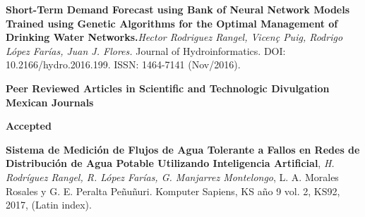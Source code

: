 \documentclass[10pt]{article}
\newenvironment{innerlist}[1][\enskip\textbullet]%
        {\begin{compactitem}[#1]}{\end{compactitem}}
\newcommand{\blankline}{\quad\pagebreak[2]}
\begin{document}
\begin{innerlist}
\item \textbf{Short-Term Demand Forecast using Bank of Neural Network Models Trained using Genetic Algorithms for the Optimal Management of Drinking Water Networks.}\textit{Hector Rodriguez Rangel, Vicen\c{c} Puig, Rodrigo López Farías, Juan J. Flores.}  {Journal of Hydroinformatics}. DOI: 10.2166/hydro.2016.199. ISSN: 1464-7141 (Nov/2016).

\blankline

\textbf{Peer Reviewed Articles in Scientific and Technologic Divulgation Mexican Journals }


\blankline

\textbf{Accepted}

\begin{innerlist}


\item \textbf{Sistema de Medición de Flujos de Agua Tolerante a Fallos en Redes de Distribución de Agua Potable Utilizando Inteligencia Artificial}, \textit{H. Rodríguez Rangel, R. López Farías, G. Manjarrez Montelongo}, L. A. Morales Rosales y G. E. Peralta Peñuñuri. Komputer Sapiens, KS año 9 vol. 2, KS92, 2017, (Latin index).

\end{innerlist}

\blankline

\end{innerlist}

\blankline
\end{document}
